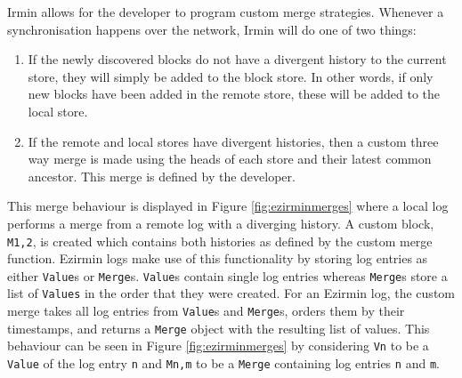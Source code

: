 \documentclass[12pt,a4paper,twoside,openright]{report}
\begin{document}
	Irmin allows for the developer to program custom merge strategies. 
	Whenever a synchronisation happens over the network, Irmin will do one of two things:
	\begin{enumerate}
		\item If the newly discovered blocks do not have a divergent history to the current store, they will simply be added to the block store. 
			In other words, if only new blocks have been added in the remote store, these will be added to the local store. 
		\item If the remote and local stores have divergent histories, then a custom three way merge is made using the heads of each store and their latest common ancestor.
		This merge is defined by the developer.
	\end{enumerate}
	This merge behaviour is displayed in Figure \ref{fig:ezirminmerges} where a local log performs a merge from a remote log with a diverging history.
	A custom block, \texttt{M1,2}, is created which contains both histories as defined by the custom merge function.
	Ezirmin logs make use of this functionality by storing log entries as either \texttt{Value}s or \texttt{Merge}s.
	\texttt{Value}s contain single log entries whereas \texttt{Merge}s store a list of \texttt{Values} in the order that they were created. 
	For an Ezirmin log, the custom merge takes all log entries from \texttt{Value}s and \texttt{Merge}s, orders them by their timestamps, and returns a \texttt{Merge} object with the resulting list of values. 
	This behaviour can be seen in Figure \ref{fig:ezirminmerges} by considering \texttt{Vn} to be a \texttt{Value} of the log entry \texttt{n} and \texttt{Mn,m} to be a \texttt{Merge} containing log entries \texttt{n} and \texttt{m}. 
\end{document}
